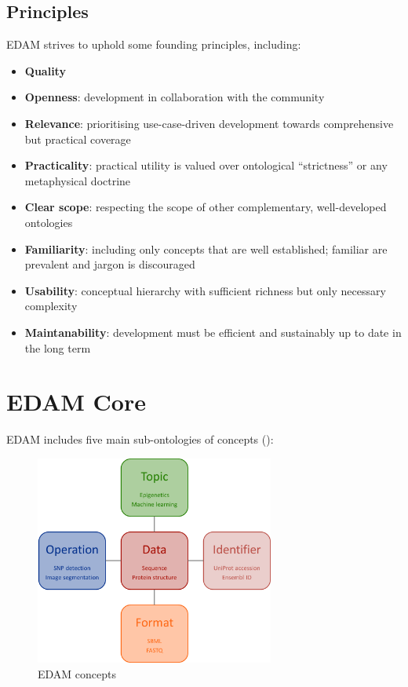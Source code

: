 \documentclass{scrartcl}
\begin{document}
\subsection{Principles}
EDAM strives to uphold some founding principles, including:
\begin{itemize}
  \item \textbf{Quality} 
  \item \textbf{Openness}: development in collaboration with the community
  \item \textbf{Relevance}: prioritising use-case-driven development towards 
    comprehensive but practical coverage
  \item \textbf{Practicality}: practical utility is valued over ontological 
    “strictness” or any metaphysical doctrine
  \item \textbf{Clear scope}: respecting the scope of other complementary, 
    well-developed ontologies
  \item \textbf{Familiarity}: including only concepts that are well established; 
    familiar are prevalent and jargon is discouraged
  \item \textbf{Usability}: conceptual hierarchy with sufficient richness but only
    necessary complexity
  \item \textbf{Maintanability}: development must be efficient and sustainably 
    up to date in the long term
\end{itemize}


\newpage

\section{EDAM Core}

EDAM includes five main sub-ontologies of concepts ():

\begin{figure}[h!]
  \centering
  \includegraphics[width=0.7\textwidth]{imgs/EDAMconcepts.png}
  \caption{EDAM concepts}
  \label{fig:concepts}
\end{figure}
\end{document}
